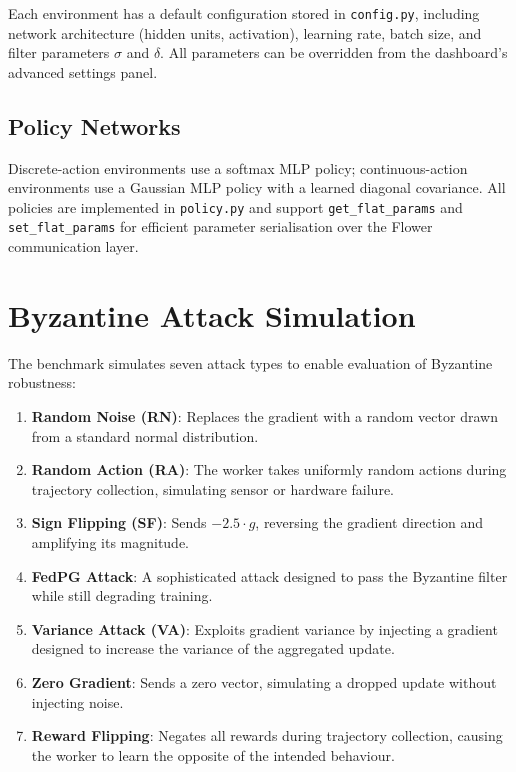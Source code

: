 Each environment has a default configuration stored in \texttt{config.py},
including network architecture (hidden units, activation), learning rate,
batch size, and filter parameters $\sigma$ and $\delta$. All parameters
can be overridden from the dashboard's advanced settings panel.

\subsection{Policy Networks}

Discrete-action environments use a softmax MLP policy; continuous-action
environments use a Gaussian MLP policy with a learned diagonal covariance.
All policies are implemented in \texttt{policy.py} and support \texttt{get\_flat\_params}
and \texttt{set\_flat\_params} for efficient parameter serialisation over the
Flower communication layer.

\section{Byzantine Attack Simulation}\label{sec:attacks}

The benchmark simulates seven attack types to enable evaluation of Byzantine
robustness:

\begin{enumerate}
    \item \textbf{Random Noise (RN)}: Replaces the gradient with a random vector
          drawn from a standard normal distribution.
    \item \textbf{Random Action (RA)}: The worker takes uniformly random actions
          during trajectory collection, simulating sensor or hardware failure.
    \item \textbf{Sign Flipping (SF)}: Sends $-2.5 \cdot g$, reversing the gradient
          direction and amplifying its magnitude.
    \item \textbf{FedPG Attack}: A sophisticated attack designed to pass the Byzantine
          filter while still degrading training.
    \item \textbf{Variance Attack (VA)}: Exploits gradient variance by injecting a
          gradient designed to increase the variance of the aggregated update.
    \item \textbf{Zero Gradient}: Sends a zero vector, simulating a dropped update
          without injecting noise.
    \item \textbf{Reward Flipping}: Negates all rewards during trajectory collection,
          causing the worker to learn the opposite of the intended behaviour.
\end{enumerate}

